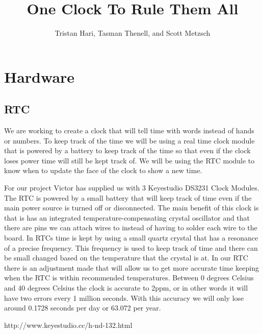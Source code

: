 \documentclass[10pt,draftclsnofoot,onecolumn]{IEEEtran}
\begin{document}
\title{One Clock To Rule Them All}
\author{Tristan Hari, Tasman Thenell, and Scott Metzsch}
\maketitle

\newpage
\section{Hardware}
\subsection{RTC}
We are working to create a clock that will tell time with words instead of hands or numbers. To keep track of the time we will be using a real time clock module that is powered by a battery to keep track of the time so that even if the clock loses power time will still be kept track of. We will be using the RTC module to know when to update the face of the clock to show a new time. 

For our project Victor has supplied us with 3 Keyestudio DS3231 Clock Modules. The RTC is powered by a small battery that will keep track of time even if the main power source is turned off or disconnected. The main benefit of this clock is that is has an integrated temperature-compensating crystal oscillator and that there are pins we can attach wires to instead of having to solder each wire to the board. In RTCs time is kept by using a small quartz crystal that has a resonance of a precise frequency. This frequency is used to keep track of time and there can be small changed based on the temperature that the crystal is at. In our RTC there is an adjustment made that will allow us to get more accurate time keeping when the RTC is within recommended temperatures. Between 0 degrees Celsius and 40 degrees Celsius the clock is accurate to 2ppm, or in other words it will have two errors every 1 million seconds. With this accuracy we will only lose around 0.1728 seconds per day or 63.072 per year. 

http://www.keyestudio.cc/h-nd-132.html
\end{document}

